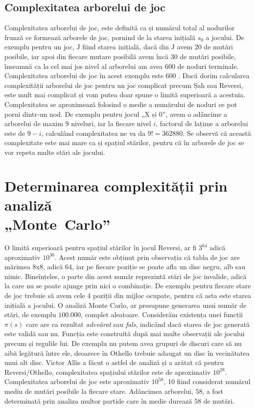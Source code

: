 \documentclass[12pt,twoside,a4paper,fleqn]{book}
\theoremstyle{definition}
\begin{document}
\subsection{Complexitatea arborelui de joc}
Complexitatea arborelui de joc, este definită ca și numărul total al nodurilor frunză ce formează arborele de joc, pornind de la starea inițială $s_{0}$ a jocului. De exemplu pentru un joc, J fiind starea inițială, dacă din J avem 20 de mutări posibile, iar apoi din fiecare mutare posibilă avem încă 30 de mutări posibile, înseamnă ca la cel mai jos nivel al arborelui am avea 600 de noduri terminale. Complexitatea arborelui de joc în acest exemplu este 600 \cite{allis}. Dacă dorim calcularea complexității arborelui de joc pentru un joc complicat precum Șah sau Reversi, este mult mai complicat și vom putea doar spune o limită superioară a acestuia. Complexitatea se aproximează folosind o medie a numărului de noduri ce pot porni dintr-un nod. De exemplu pentru jocul „X și 0”, avem o adâncime a arborelui de maxim 9 niveluri, iar la fiecare nivel $i$, factorul de lațime a arborelui este de $9 - i$, calculând complexitatea ne va da $9! = 362880$. Se observă că această complexitate este mai mare ca și spațiul stărilor, pentru că în arborele de joc se vor repeta multe stări ale jocului.

\section{Determinarea complexității prin analiză\\ \hbox{„Monte Carlo”}}
O limită superioară pentru spațiul stărilor în jocul Reversi, ar fi $3^{64}$ adică aproximativ $10^{30}$. Acest număr este obținut prin observația că tabla de joc are mărimea 8x8, adică 64, iar pe fiecare poziție se poate afla un disc negru, alb sau nimic. Bineînțeles, o parte din acest număr reprezintă stări de joc invalide, adică la care nu se poate ajunge prin nici o combinație. De exemplu pentru fiecare stare de joc trebuie să avem cele 4 poziții din mijloc ocupate, pentru că asta este starea inițială a jocului. O analiză Monte Carlo, ar presupune generarea unui număr de stări, de exemplu $100.000$, complet aleatoare. Considerăm existența unei funcții $\pi(s)$ care are ca rezultat \emph{adevărat} sau \emph{fals}, indicând dacă starea de joc generată este validă sau nu. Funcția este construită după mai multe observații ale jocului precum și regulile lui. De exemplu nu putem avea grupuri de discuri care să nu aibă legătură între ele, deoarece în Othello trebuie adaugat un disc în vecinătatea unui alt disc. Victor Allis \cite{allis} a făcut o astfel de analiză și a arătat că pentru Reversi/Othello, complexitatea spațiului stărilor este de aproximativ $10^{28}$.\\
Complexitatea arborelui de joc este aproximativ $10^{58}$, 10 fiind considerat numărul mediu de mutări posibile la fiecare stare. Adâncimea arborelui, $58$, a fost determinată prin analiza multor partide care în medie durează $58$ de mutări. \cite{allis}
\end{document}
